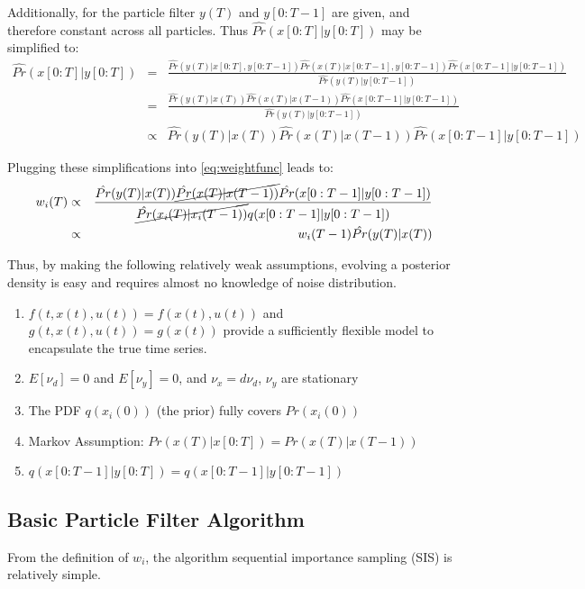Additionally, for the particle filter $y(T)$ and $y[0:T-1]$ are 
given, and therefore constant across all particles. Thus $\hat{Pr}(x[0:T] | y[0:T])$
may be simplified to:
\begin{eqnarray}
\hat{Pr}(x[0:T] | y[0:T]) & = & \frac{\hat{Pr}(y(T)| x[0:T], y[0:T-1]) \hat{Pr}(x(T) | x[0:T-1], y[0:T-1]) 
            \hat{Pr}(x[0:T-1] | y[0:T-1])}{\hat{Pr}(y(T) | y[0:T-1])} \nonumber \\
& = & \frac{\hat{Pr}(y(T)| x(T)) \hat{Pr}(x(T) | x(T-1)) \hat{Pr}(x[0:T-1] | y[0:T-1])}{\hat{Pr}(y(T) | y[0:T-1])} \nonumber \\
& \propto & \hat{Pr}(y(T)| x(T)) \hat{Pr}(x(T) | x(T-1)) \hat{Pr}(x[0:T-1] | y[0:T-1])
\end{eqnarray}

Plugging these simplifications into \autoref{eq:weightfunc} leads to:
\begin{eqnarray}
w_i(T) & \propto & \frac{\hat{Pr}(y(T)| x(T)) \cancel{\hat{Pr}(x(T) | x(T-1))} \hat{Pr}(x[0:T-1] | y[0:T-1])}
                         {\cancel{\hat{Pr}(x_i(T) | x_i(T-1))}q(x[0:T-1] | y[0:T-1])} \nonumber \\
& \propto & w_i(T-1)\hat{Pr}(y(T)| x(T)) 
\label{eq:weightevolve}
\end{eqnarray}

Thus, by making the following relatively weak assumptions, evolving a posterior
density  is easy and requires almost no knowledge of noise distribution.
\begin{enumerate}
\item $f(t, x(t), u(t)) = f(x(t), u(t))$ and $g(t, x(t), u(t)) = g(x(t))$ provide 
a sufficiently flexible model to encapsulate the true time series.
\item $E[\nu_d] = 0$ and $E[\nu_y] = 0$, and $\nu_x = d\nu_d$, $\nu_y$ are stationary
\item The PDF $q(x_i(0))$ (the prior) fully covers $Pr(x_i(0))$
\item Markov Assumption: $Pr(x(T) | x[0:T]) = Pr(x(T) | x(T-1))$
\item $q(x[0:T-1] | y[0:T]) = q(x[0:T-1] | y[0:T-1])$
\end{enumerate}

\subsection{Basic Particle Filter Algorithm}
From the definition of $w_i$, the algorithm sequential importance sampling (SIS) 
is relatively simple. 

